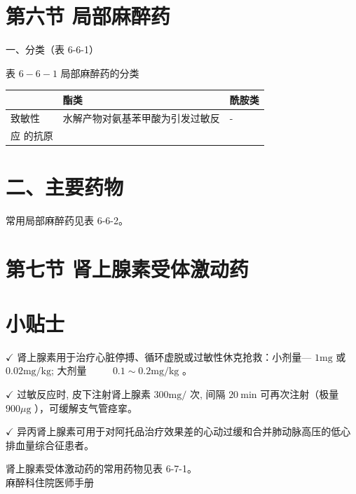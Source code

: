 \documentclass[10pt]{article}
\begin{document}
\section*{第六节 局部麻醉药}
一、分类（表 6-6-1）

表 $6-6-1$ 局部麻醉药的分类

\begin{center}
\begin{tabular}{lll}
\hline
 & 酯类 & 酰胺类 \\
\hline
致敏性 & 水解产物对氨基苯甲酸为引发过敏反 & - \\
应 的抗原 &  &  \\
\end{tabular}
\end{center}

\section*{二、主要药物}
常用局部麻醉药见表 6-6-2。

\section*{第七节 肾上腺素受体激动药}
\section*{小贴士}
$\checkmark$ 肾上腺素用于治疗心脏停搏、循环虚脱或过敏性休克抢救：小剂量— $1 \mathrm{mg}$ 或 $0.02 \mathrm{mg} / \mathrm{kg}$; 大剂量 $\qquad$ $0.1 \sim 0.2 \mathrm{mg} / \mathrm{kg}$ 。

$\checkmark$ 过敏反应时, 皮下注射肾上腺素 $300 \mathrm{mg} /$ 次, 间隔 $20 \mathrm{~min}$ 可再次注射（极量 $900 \mu \mathrm{g}$ ），可缓解支气管痉挛。

$\checkmark$ 异丙肾上腺素可用于对阿托品治疗效果差的心动过缓和合并肺动脉高压的低心排血量综合征患者。

肾上腺素受体激动药的常用药物见表 6-7-1。\\
麻醉科住院医师手册
\end{document}
